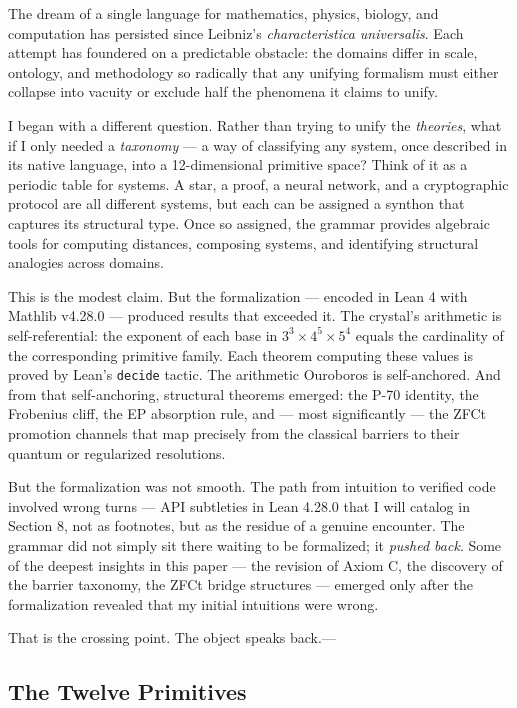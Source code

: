\documentclass[12pt,a4paper]{article}
\begin{document}
The dream of a single language for mathematics, physics, biology, and computation has persisted since Leibniz's \emph{characteristica universalis}. Each attempt has foundered on a predictable obstacle: the domains differ in scale, ontology, and methodology so radically that any unifying formalism must either collapse into vacuity or exclude half the phenomena it claims to unify.

I began with a different question. Rather than trying to unify the \emph{theories}, what if I only needed a \emph{taxonomy} --- a way of classifying any system, once described in its native language, into a 12-dimensional primitive space? Think of it as a periodic table for systems. A star, a proof, a neural network, and a cryptographic protocol are all different systems, but each can be assigned a synthon that captures its structural type. Once so assigned, the grammar provides algebraic tools for computing distances, composing systems, and identifying structural analogies across domains.

This is the modest claim. But the formalization --- encoded in Lean 4 with Mathlib v4.28.0 --- produced results that exceeded it. The crystal's arithmetic is self-referential: the exponent of each base in $3^3 \times 4^5 \times 5^4$ equals the cardinality of the corresponding primitive family. Each theorem computing these values is proved by Lean's \texttt{decide} tactic. The arithmetic Ouroboros is self-anchored. And from that self-anchoring, structural theorems emerged: the P-70 identity, the Frobenius cliff, the EP absorption rule, and --- most significantly --- the ZFCt promotion channels that map precisely from the classical barriers to their quantum or regularized resolutions.

But the formalization was not smooth. The path from intuition to verified code involved wrong turns --- API subtleties in Lean 4.28.0 that I will catalog in Section 8, not as footnotes, but as the residue of a genuine encounter. The grammar did not simply sit there waiting to be formalized; it \emph{pushed back}. Some of the deepest insights in this paper --- the revision of Axiom C, the discovery of the barrier taxonomy, the ZFCt bridge structures --- emerged only after the formalization revealed that my initial intuitions were wrong.

That is the crossing point. The object speaks back.---

\subsection{The Twelve Primitives}
\end{document}
